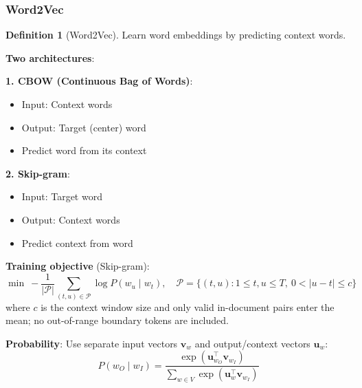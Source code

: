 \documentclass[11pt,twoside]{article}
\numberwithin{equation}{section}
\newcommand{\vect}[1]{\bm{#1}}
\theoremstyle{plain}
\theoremstyle{definition}
\newtheorem{definition}[theorem]{Definition}
\theoremstyle{remark}
\begin{document}
\subsubsection{Word2Vec}

\begin{definition}[Word2Vec]
Learn word embeddings by predicting context words.

\textbf{Two architectures}:

\textbf{1. CBOW (Continuous Bag of Words)}:
\begin{itemize}
\item Input: Context words
\item Output: Target (center) word
\item Predict word from its context
\end{itemize}

\textbf{2. Skip-gram}:
\begin{itemize}
\item Input: Target word
\item Output: Context words
\item Predict context from word
\end{itemize}

\textbf{Training objective} (Skip-gram):
\[
\min\ -\frac{1}{|\mathcal P|}\sum_{(t,u)\in\mathcal P}\log P(w_u\mid w_t),\quad
\mathcal P=\{(t,u):1\le t,u\le T,\ 0<|u-t|\le c\}
\]
where $c$ is the context window size and only valid in-document pairs enter the mean; no out-of-range boundary tokens are included.

\textbf{Probability}: Use separate input vectors $\vect{v}_w$ and output/context vectors $\vect{u}_w$:
\[
P(w_O\mid w_I)=\frac{\exp(\vect{u}_{w_O}^\top\vect{v}_{w_I})}{\sum_{w\in V}\exp(\vect{u}_w^\top\vect{v}_{w_I})}
\]
\end{definition}
\end{document}
